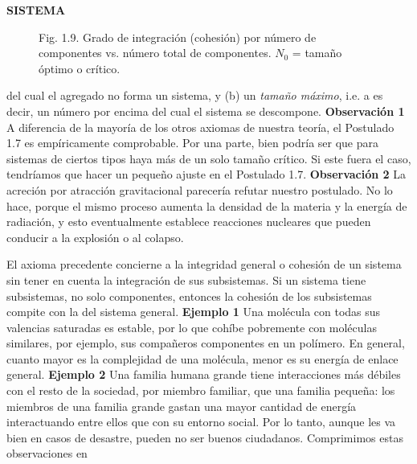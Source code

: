 \newpage
\fancyhf{}
\fancyhead[r]{\thepage}
\begin{center}
{\fontsize{13}{16}\selectfont \textbf{SISTEMA}}
\end{center}
\vspace{0.5cm}

{\fontsize{13}{15}\selectfont
\begin{figure}[h!]
    \centering
    \caption*{Fig. 1.9. Grado de integración (cohesión) por número de componentes vs. número total de componentes. \( N_0 \) = tamaño óptimo o crítico.}
\end{figure}
del cual el agregado no forma un sistema, y (b) un \textit{tamaño máximo}, i.e. a es decir, un número por encima del cual el sistema se descompone.
\textbf{Observación 1} A diferencia de la mayoría de los otros axiomas de nuestra teoría, el Postulado 1.7 es empíricamente comprobable. 
Por una parte, bien podría ser que para sistemas de ciertos tipos haya más de un solo tamaño crítico. Si este fuera el caso, tendríamos que hacer un pequeño ajuste en el Postulado 1.7.
 \textbf{Observación 2} La acreción por atracción gravitacional parecería refutar nuestro postulado. No lo hace, porque el mismo proceso aumenta la densidad de la materia y la energía de radiación, y esto eventualmente establece reacciones nucleares que pueden conducir a la explosión o al colapso. \par
El axioma precedente concierne a la integridad general o cohesión de un sistema sin tener en cuenta la integración de sus subsistemas. 
Si un sistema tiene subsistemas, no solo componentes, entonces la cohesión de los subsistemas compite con la del sistema general. \textbf{Ejemplo 1} Una molécula con todas sus valencias saturadas es estable, por lo que cohíbe pobremente con moléculas similares, por ejemplo, sus compañeros componentes en un polímero. 
En general, cuanto mayor es la complejidad de una molécula, menor es su energía de enlace general. \textbf{Ejemplo 2} Una familia humana grande tiene interacciones más débiles con el resto de la sociedad, por miembro familiar, que una familia pequeña: los miembros de una familia grande gastan una mayor cantidad de energía interactuando entre ellos que con su entorno social. 
Por lo tanto, aunque les va bien en casos de desastre, pueden no ser buenos ciudadanos.
Comprimimos estas observaciones en
}

